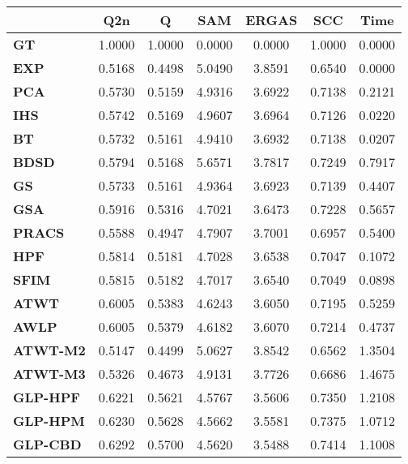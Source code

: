 \begin{tabular}{|l|c|c|c|c|c|c|}
\hline
&\textbf{Q2n}&\textbf{Q}&\textbf{SAM}&\textbf{ERGAS}&\textbf{SCC}&\textbf{Time}\\\hline
\textbf{GT}&1.0000&1.0000&0.0000&0.0000&1.0000&0.0000\\\hline
\textbf{EXP}&0.5168&0.4498&5.0490&3.8591&0.6540&0.0000\\\hline
\textbf{PCA}&0.5730&0.5159&4.9316&3.6922&0.7138&0.2121\\\hline
\textbf{IHS}&0.5742&0.5169&4.9607&3.6964&0.7126&0.0220\\\hline
\textbf{BT}&0.5732&0.5161&4.9410&3.6932&0.7138&0.0207\\\hline
\textbf{BDSD}&0.5794&0.5168&5.6571&3.7817&0.7249&0.7917\\\hline
\textbf{GS}&0.5733&0.5161&4.9364&3.6923&0.7139&0.4407\\\hline
\textbf{GSA}&0.5916&0.5316&4.7021&3.6473&0.7228&0.5657\\\hline
\textbf{PRACS}&0.5588&0.4947&4.7907&3.7001&0.6957&0.5400\\\hline
\textbf{HPF}&0.5814&0.5181&4.7028&3.6538&0.7047&0.1072\\\hline
\textbf{SFIM}&0.5815&0.5182&4.7017&3.6540&0.7049&0.0898\\\hline
\textbf{ATWT}&0.6005&0.5383&4.6243&3.6050&0.7195&0.5259\\\hline
\textbf{AWLP}&0.6005&0.5379&4.6182&3.6070&0.7214&0.4737\\\hline
\textbf{ATWT-M2}&0.5147&0.4499&5.0627&3.8542&0.6562&1.3504\\\hline
\textbf{ATWT-M3}&0.5326&0.4673&4.9131&3.7726&0.6686&1.4675\\\hline
\textbf{GLP-HPF}&0.6221&0.5621&4.5767&3.5606&0.7350&1.2108\\\hline
\textbf{GLP-HPM}&0.6230&0.5628&4.5662&3.5581&0.7375&1.0712\\\hline
\textbf{GLP-CBD}&0.6292&0.5700&4.5620&3.5488&0.7414&1.1008\\\hline
\end{tabular}

